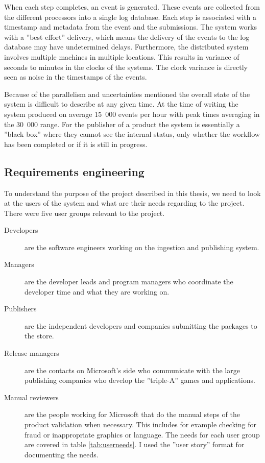 
When each step completes, an event is generated.
These events are collected from the different processors into a single log database.
Each step is associated with a timestamp and metadata from the event and the submissions.
The system works with a ''best effort'' delivery, which means the delivery of the events to the log database
may have undetermined delays. Furthermore, the distributed system involves multiple machines
in multiple locations. This results in variance of seconds to minutes in the clocks of the systems.
The clock variance is directly seen as noise in the timestamps of the events.

Because of the parallelism and uncertainties mentioned the overall state of the system is difficult to describe at any given time. At the time of writing the system produced on average 15~000 events per hour with peak times averaging in the 30~000 range. For the publisher of a product the system is essentially a ''black box'' where
they cannot see the internal status, only whether the workflow has been completed or if it is still in progress.

\subsection{Requirements engineering}

To understand the purpose of the project described in this thesis, we need to look at the users of the system
and what are their needs regarding to the project. There were five user groups relevant to the project.

\begin{description}
\item[Developers] are the software engineers working on the ingestion and publishing system.
\item[Managers] are the developer leads and program managers who coordinate the developer time and what they are working on.
\item[Publishers] are the independent developers and companies submitting the packages to the store.
\item[Release managers] are the contacts on Microsoft's side who communicate with the large publishing companies who develop the ''triple-A'' games and applications.
\item[Manual reviewers] are the people working for Microsoft that do the manual steps of the product validation when necessary. This includes for example checking for fraud or inappropriate graphics or language.
The needs for each user group are covered in table \ref{tab:userneeds}.
I used the ''user story'' format for documenting the needs.
\end{description}

